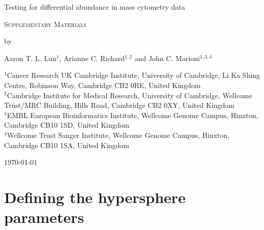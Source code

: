 \documentclass{article}
\begin{document}
\begin{titlepage}
\vspace*{3cm}
\begin{center}

{\LARGE
Testing for differential abundance in mass cytometry data
\par}

\vspace{0.75cm}

{\Large 
    \textsc{Supplementary Materials}
\par
}
\vspace{0.75cm}

\large
by

\vspace{0.75cm}
Aaron T. L. Lun$^{1}$, Arianne C. Richard$^{1,2}$ and John C. Marioni$^{1,3,4}$

\vspace{1cm}
\begin{minipage}{0.9\textwidth}
\begin{flushleft} 
$^1$Cancer Research UK Cambridge Institute, University of Cambridge, Li Ka Shing Centre, Robinson Way, Cambridge CB2 0RE, United Kingdom \\[6pt]
$^2$Cambridge Institute for Medical Research,  University of Cambridge, Wellcome Trust/MRC Building, Hills Road, Cambridge CB2 0XY, United Kingdom \\[6pt]
$^3$EMBL European Bioinformatics Institute, Wellcome Genome Campus, Hinxton, Cambridge CB10 1SD, United Kingdom \\[6pt]
$^4$Wellcome Trust Sanger Institute, Wellcome Genome Campus, Hinxton, Cambridge CB10 1SA, United Kingdom \\[6pt]
\end{flushleft}
\end{minipage}

\vspace{1.5cm}
{\large \today{}}

\vspace*{\fill}
\end{center}
\end{titlepage}

\section{Defining the hypersphere parameters}
\end{document}

